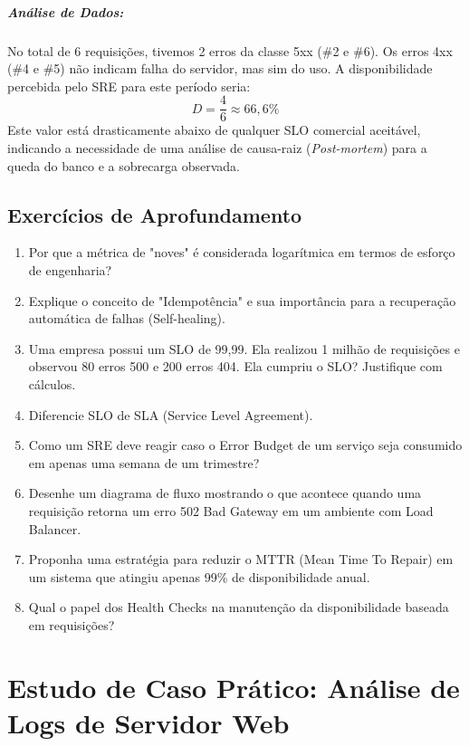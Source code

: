 \documentclass[12pt,a4paper]{report}
\begin{document}
\paragraph{Análise de Dados:}
No total de 6 requisições, tivemos 2 erros da classe 5xx (\#2 e \#6). Os erros 4xx (\#4 e \#5) não indicam falha do servidor, mas sim do uso.
A disponibilidade percebida pelo SRE para este período seria:
\[ D = \frac{4}{6} \approx 66,6\% \]
Este valor está drasticamente abaixo de qualquer SLO comercial aceitável, indicando a necessidade de uma análise de causa-raiz (\textit{Post-mortem}) para a queda do banco e a sobrecarga observada.

\section{Exercícios de Aprofundamento}

\begin{enumerate}
    \item Por que a métrica de "noves" é considerada logarítmica em termos de esforço de engenharia?
    \item Explique o conceito de "Idempotência" e sua importância para a recuperação automática de falhas (Self-healing).
    \item Uma empresa possui um SLO de 99,99. Ela realizou 1 milhão de requisições e observou 80 erros 500 e 200 erros 404. Ela cumpriu o SLO? Justifique com cálculos.
    \item Diferencie SLO de SLA (Service Level Agreement).
    \item Como um SRE deve reagir caso o Error Budget de um serviço seja consumido em apenas uma semana de um trimestre?
    \item Desenhe um diagrama de fluxo mostrando o que acontece quando uma requisição retorna um erro 502 Bad Gateway em um ambiente com Load Balancer.
    \item Proponha uma estratégia para reduzir o MTTR (Mean Time To Repair) em um sistema que atingiu apenas 99\% de disponibilidade anual.
    \item Qual o papel dos Health Checks na manutenção da disponibilidade baseada em requisições?
\end{enumerate}

\chapter{Estudo de Caso Prático: Análise de Logs de Servidor Web}
\end{document}
